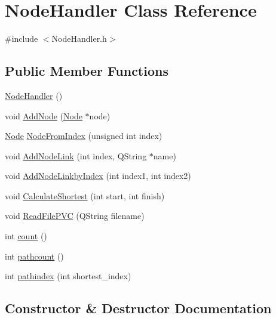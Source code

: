 \hypertarget{class_node_handler}{}\section{Node\+Handler Class Reference}
\label{class_node_handler}


{\ttfamily \#include $<$Node\+Handler.\+h$>$}

\subsection*{Public Member Functions}
\begin{DoxyCompactItemize}
\item 
\hyperlink{class_node_handler_a9386f623db3e2bbb3e72d9a43b9b0e74}{Node\+Handler} ()
\item 
void \hyperlink{class_node_handler_a6c7bf3121983c6b71b3f695c5beb8702}{Add\+Node} (\hyperlink{class_node}{Node} $\ast$node)
\item 
\hyperlink{class_node}{Node} \hyperlink{class_node_handler_a29f02b37ec6cd4f00d53905de849d2a5}{Node\+From\+Index} (unsigned int index)
\item 
void \hyperlink{class_node_handler_a35cf264e2a82ee1a387cc51a77cb9a0f}{Add\+Node\+Link} (int index, Q\+String $\ast$name)
\item 
void \hyperlink{class_node_handler_ae40d4d280d3509d507f9f9a702f5380b}{Add\+Node\+Linkby\+Index} (int index1, int index2)
\item 
void \hyperlink{class_node_handler_a0ab16b4d8eae215137b678e74e851796}{Calculate\+Shortest} (int start, int finish)
\item 
void \hyperlink{class_node_handler_a9de09ae39f58d5ba8d7296cc7b9479a6}{Read\+File\+P\+V\+C} (Q\+String filename)
\item 
int \hyperlink{class_node_handler_a55e85b7d5feaacfb99c9c523f67a274f}{count} ()
\item 
int \hyperlink{class_node_handler_ade4fdb71766ffdd2b8dae666ce571655}{pathcount} ()
\item 
int \hyperlink{class_node_handler_adb91365c0b497b0be7bbd7ce14ee552d}{pathindex} (int shortest\+\_\+index)
\end{DoxyCompactItemize}


\subsection{Constructor \& Destructor Documentation}
\hypertarget{class_node_handler_a9386f623db3e2bbb3e72d9a43b9b0e74}{}
